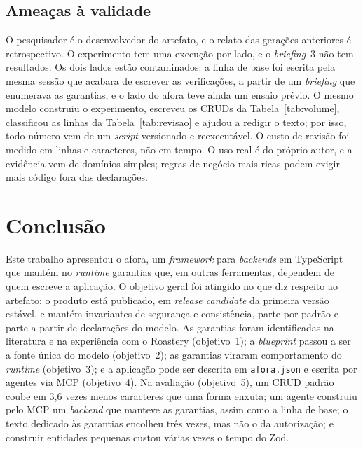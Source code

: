 \documentclass[a4paper,12pt]{article}
\newcommand{\estr}[1]{\textit{#1}}
\begin{document}
\subsection{Ameaças à validade}

O pesquisador é o desenvolvedor do artefato, e o relato das gerações anteriores é retrospectivo. O experimento tem uma execução por lado, e o \estr{briefing}~3 não tem resultados. Os dois lados estão contaminados: a linha de base foi escrita pela mesma sessão que acabara de escrever as verificações, a partir de um \estr{briefing} que enumerava as garantias, e o lado do afora teve ainda um ensaio prévio. O mesmo modelo construiu o experimento, escreveu os CRUDs da Tabela~\ref{tab:volume}, classificou as linhas da Tabela~\ref{tab:revisao} e ajudou a redigir o texto; por isso, todo número vem de um \estr{script} versionado e reexecutável. O custo de revisão foi medido em linhas e caracteres, não em tempo. O uso real é do próprio autor, e a evidência vem de domínios simples; regras de negócio mais ricas podem exigir mais código fora das declarações.

\section{Conclusão}\label{sec:conclusao}

Este trabalho apresentou o afora, um \estr{framework} para \estr{backends} em TypeScript que mantém no \estr{runtime} garantias que, em outras ferramentas, dependem de quem escreve a aplicação. O objetivo geral foi atingido no que diz respeito ao artefato: o produto está publicado, em \estr{release candidate} da primeira versão estável, e mantém invariantes de segurança e consistência, parte por padrão e parte a partir de declarações do modelo. As garantias foram identificadas na literatura e na experiência com o Roastery (objetivo~1); a \estr{blueprint} passou a ser a fonte única do modelo (objetivo~2); as garantias viraram comportamento do \estr{runtime} (objetivo~3); e a aplicação pode ser descrita em \texttt{afora.json} e escrita por agentes via MCP (objetivo~4). Na avaliação (objetivo~5), um CRUD padrão coube em 3,6 vezes menos caracteres que uma forma enxuta; um agente construiu pelo MCP um \estr{backend} que manteve as garantias, assim como a linha de base; o texto dedicado às garantias encolheu três vezes, mas não o da autorização; e construir entidades pequenas custou várias vezes o tempo do Zod.
\end{document}
